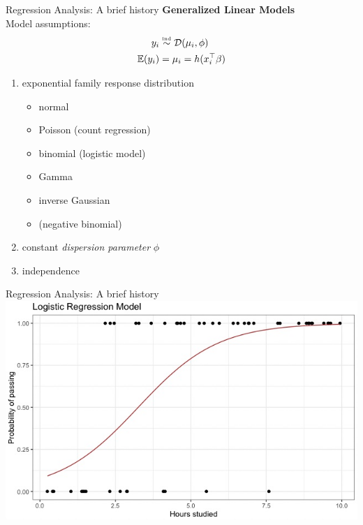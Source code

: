 \documentclass[t]{beamer} 	%
\begin{document}
\begin{frame}{Regression Analysis: A brief history}
	\textbf{Generalized Linear Models} \\
	Model assumptions:
	\begin{align*}
		y_i&\stackrel{\hbox{\tiny{ind}}}{\sim} \mathcal{D}(\mu_i,\phi)\\
		\mathbb{E}(y_i)&=\mu_i=h(x_i^\top\beta)
	\end{align*}
	\begin{enumerate}
	\item exponential family response distribution
		\begin{itemize}
			\item normal
			\item Poisson (count regression)
			\item binomial (logistic model)
			\item Gamma
			\item inverse Gaussian
			\item (negative binomial)
		\end{itemize}
	\item constant \textit{dispersion parameter} $\phi$
	\item independence
	\end{enumerate}
\end{frame}

\begin{frame}[c]{Regression Analysis: A brief history}
	\includegraphics[width=\textwidth]{images/exam_pass_logistic.jpg}
\end{frame}
\end{document}
